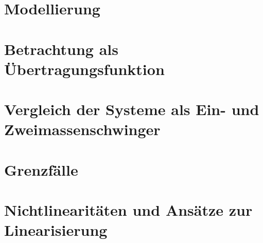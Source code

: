 \section{Modellierung}
\label{sec:modellierung}

\pagebreak

\section{Betrachtung als Übertragungsfunktion}
\label{sec:ubertragungsfunktion}

\pagebreak

\section{Vergleich der Systeme als Ein- und Zweimassenschwinger}
\label{sec:1ms2ms}

\pagebreak

\section{Grenzfälle}
\label{sec:grenzfalle}

\pagebreak

\section{Nichtlinearitäten und Ansätze zur Linearisierung}
\label{sec:nichtlinearitaten}

\pagebreak